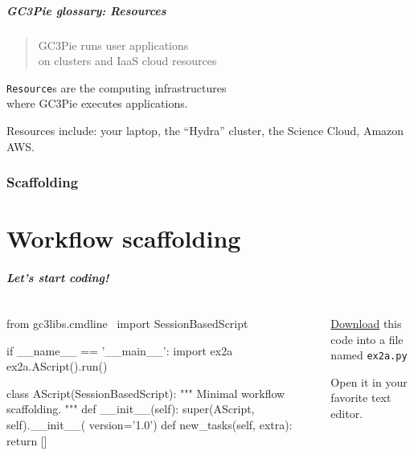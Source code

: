 \documentclass[english,serif,mathserif,xcolor=pdftex,dvipsnames,table]{beamer}
\begin{document}
\begin{frame}
  \frametitle{GC3Pie glossary: Resources}
  \begin{quote}
    GC3Pie runs user applications
    \\
    on clusters and IaaS cloud \alert{resources}
  \end{quote}

  \+ \alert{\texttt{Resource}s are the computing infrastructures \\ where GC3Pie executes applications.}

  \+ Resources include: your laptop, the ``Hydra'' cluster, the Science Cloud, Amazon AWS.
\end{frame}


\section{Scaffolding}
\part{Workflow scaffolding}

\begin{frame}[fragile]
  \frametitle{Let's start coding!}
  \begin{columns}
    \begin{column}{0.7\linewidth}
\begin{python}
from gc3libs.cmdline \
  import SessionBasedScript

if __name__ == '__main__':
  import ex2a
  ex2a.AScript().run()

class AScript(SessionBasedScript):
  """
  Minimal workflow scaffolding.
  """
  def __init__(self):
    super(AScript, self).__init__(
        version='1.0')
  def new_tasks(self, extra):
    return []
\end{python}
    \end{column}
    \begin{column}{0.3\linewidth}
      \href{https://raw.githubusercontent.com/uzh/gc3pie/master/docs/programmers/tutorials/workflows/solutions/ex2a.py}{Download} this code into a file named \texttt{ex2a.py}

      \+
      Open it in your favorite text editor.
    \end{column}
  \end{columns}
\end{frame}
\end{document}

